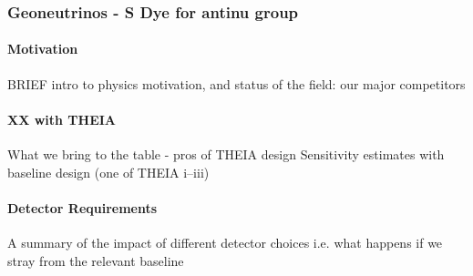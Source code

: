\subsubsection{Geoneutrinos - S Dye for antinu group}
\paragraph{Motivation}
BRIEF intro to physics motivation, and status of the field: our major competitors
\paragraph{XX with THEIA}
What we bring to the table - pros of THEIA design \newline
Sensitivity estimates with baseline design (one of THEIA i--iii)
\paragraph{Detector Requirements}
A summary of the impact of different detector choices i.e. what happens if we stray from the relevant baseline
